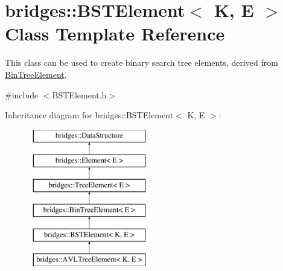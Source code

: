 \hypertarget{classbridges_1_1_b_s_t_element}{}\section{bridges\+:\+:B\+S\+T\+Element$<$ K, E $>$ Class Template Reference}
\label{classbridges_1_1_b_s_t_element}


This class can be used to create binary search tree elements, derived from \hyperlink{classbridges_1_1_bin_tree_element}{Bin\+Tree\+Element}.  




{\ttfamily \#include $<$B\+S\+T\+Element.\+h$>$}

Inheritance diagram for bridges\+:\+:B\+S\+T\+Element$<$ K, E $>$\+:\begin{figure}[H]
\begin{center}
\leavevmode
\includegraphics[height=6.000000cm]{classbridges_1_1_b_s_t_element}
\end{center}
\end{figure}
